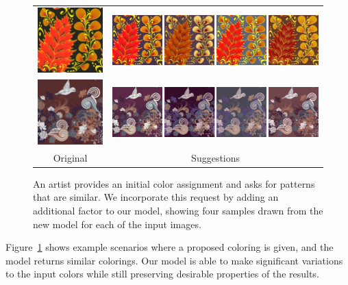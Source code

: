 \begin{figure}[ht]
\begin{tabular}{cc}
{\includegraphics[width=.1785\columnwidth]{figs/guidedSearch1Original}}&\includegraphics[width=.735\columnwidth]{figs/guidedSearch1MMR}\vspace{0.5em}\\
{\includegraphics[width=.1785\columnwidth]{figs/guidedSearch0Original}}&\includegraphics[width=.735\columnwidth]{figs/guidedSearch0MMR}\vspace{0.5em}\\
Original&Suggestions\\
\end{tabular}

\caption{An artist provides an initial color assignment and asks for patterns that are similar. We incorporate this request by adding an additional factor to our model, showing four samples drawn from the new model for each of the input images.}
\label{fig:nearbySuggestions}
\vspace{-1.0em}
\end{figure}

Figure~\ref{fig:nearbySuggestions} shows example scenarios where a proposed coloring is given, and the model returns similar colorings. Our model is able to make significant variations to the input colors while still preserving desirable properties of the results.

